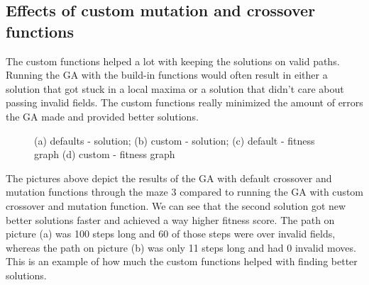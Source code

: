 \documentclass{article}
\begin{document}
\begin{description}
\begin{description}
    \subsection{Effects of custom mutation and crossover functions}
        The custom functions helped a lot with keeping the solutions on valid paths. Running the GA with the build-in functions would often result in either a solution that got stuck in a local maxima or a solution that didn't care about passing invalid fields. The custom functions really minimized the amount of errors the GA made and provided better solutions.


	\begin{figure}[H]
		\begin{minipage}{.5\linewidth}
			\centering
		 \end{minipage}%
		\begin{minipage}{.5\linewidth}
			\centering
		 \end{minipage}\par\medskip%
		\begin{minipage}{.5\linewidth}
			\centering
		 \end{minipage}%
		\begin{minipage}{.5\linewidth}
			\centering
		 \end{minipage}\par\medskip%
		
		\caption{
			(a)  defaults - solution; 
			(b)  custom - solution; 
			(c) default - fitness graph 
			(d)  custom - fitness graph
		}
	\end{figure}
	The pictures above depict the results of the GA with default crossover and mutation functions through the maze 3 compared to running the GA with custom crossover and mutation function. We can see that the second solution got new better solutions faster and achieved a way higher fitness score. The path on picture (a) was 100 steps long and 60 of those steps were over invalid fields, whereas the path on picture (b) was only 11 steps long and had 0 invalid moves.  This is an example of how much the custom functions helped with finding better solutions. 


\end{description}
\end{description}
\end{document}
